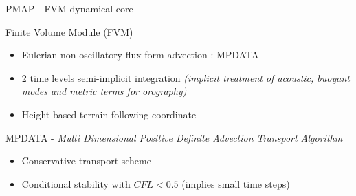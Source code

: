 \documentclass{beamer}
\begin{document}
\begin{frame}{PMAP - FVM dynamical core}

    \begin{block}{Finite Volume Module (FVM)}
        \begin{itemize}
            \item Eulerian non-oscillatory flux-form advection : MPDATA
            \item 2 time levels semi-implicit integration \newline\tiny \textit{(implicit treatment of acoustic, 
            buoyant modes and metric terms for orography)}
            \normalsize \item Height-based terrain-following coordinate
        \end{itemize}
    \end{block}

    \begin{block}{MPDATA -  \scriptsize \textit{Multi Dimensional Positive Definite Advection Transport Algorithm}}
       
        \begin{itemize}
            \item Conservative transport scheme
            \item Conditional stability with $CFL < 0.5$ (implies small time steps)
        \end{itemize}
        
    \end{block}

\end{frame}
\end{document}
